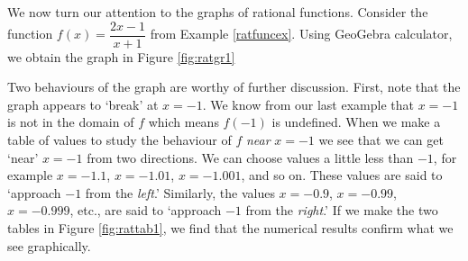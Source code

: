 \medskip

We now turn our attention to the graphs of rational functions. Consider the function $f(x) = \dfrac{2x-1}{x+1}$ from Example \ref{ratfuncex}.  Using GeoGebra calculator, we obtain the graph in Figure \ref{fig:ratgr1}





Two behaviours of the graph are worthy of further discussion.  First, note that the graph appears to `break' at $x=-1$. We know from our last example that $x=-1$ is not in the domain of $f$ which means $f(-1)$ is undefined. When we make a table of values to study the behaviour of $f$ \textit{near} $x=-1$ we see that we can get `near' $x=-1$ from two directions.  We can choose values a little less than $-1$, for example $x=-1.1$, $x=-1.01$, $x=-1.001$, and so on.  These values are said to `approach $-1$ from the \textit{left}.'  Similarly, the values $x=-0.9$, $x=-0.99$, $x=-0.999$, etc., are said to `approach $-1$ from the \textit{right}.'  If we make the two tables in Figure \ref{fig:rattab1}, we find that the numerical results confirm what we see graphically.



